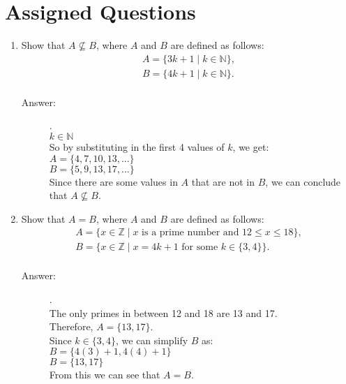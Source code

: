 \documentclass[12pt, oneside]{article}
\begin{document}
\section*{Assigned Questions}
\begin{enumerate}
\item Show that $A \nsubseteq B$, where $A$ and $B$ are defined as follows:
\[
\begin{array}{l}
A = \{3k + 1 \mid k \in \mathbb{N}\}, \\
B = \{4k + 1 \mid k \in \mathbb{N}\}. \\
\end{array}
\]

\begin{description}
    \item[Answer:] .\\
        $k \in \mathbb{N}$\\
        So by substituting in the first 4 values of $k$, we get:\\
        $A = \{ 4,7,10,13,... \}$\\
        $B = \{ 5,9,13,17,... \}$\\
        Since there are some values in $A$ that are not in $B$, we can conclude that $A \nsubseteq B$.
\end{description}

\item Show that $A = B$, where $A$ and $B$ are defined as follows:
\[
\begin{array}{l}
A = \{x\in\mathbb{Z} \mid x \textrm{ is a prime number and } 12 \leq x \leq 18\}, \\
B = \{x\in\mathbb{Z} \mid x = 4k + 1\textrm{ for some } k \in \{3, 4\}\}. \\
\end{array}
\]

\begin{description}
    \item[Answer:] .\\
        The only primes in between 12 and 18 are 13 and 17.\\
        Therefore, $A = \{ 13,17 \}$.\\
        Since $k \in \{3,4\}$, we can simplify $B$ as:\\
        $B = \{4(3)+1,4(4)+1\}$\\
        $B = \{13,17\}$\\
        From this we can see that $A=B$.
\end{description}


\end{enumerate}
\end{document}
